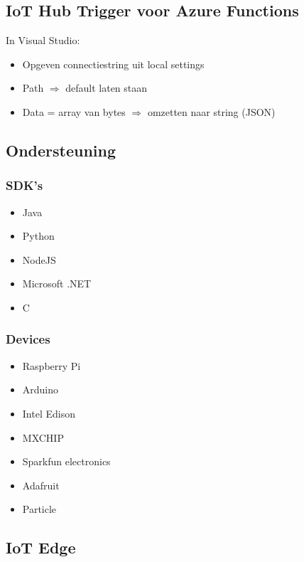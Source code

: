 \documentclass{article}
\begin{document}
\subsection{IoT Hub Trigger voor Azure Functions}

In Visual Studio: 

\begin{itemize}
    \item Opgeven connectiestring uit local settings
    \item Path $\Rightarrow$ default laten staan
    \item Data = array van bytes $\Rightarrow$ omzetten naar string (JSON)
\end{itemize}

\subsection{Ondersteuning}

\subsubsection{SDK's}

\begin{itemize}
    \item Java 
    \item Python
    \item NodeJS
    \item Microsoft .NET
    \item C
\end{itemize}

\subsubsection{Devices}

\begin{itemize}
    \item Raspberry Pi
    \item Arduino
    \item Intel Edison
    \item MXCHIP
    \item Sparkfun electronics
    \item Adafruit
    \item Particle
\end{itemize}

\subsection{IoT Edge}
\end{document}

